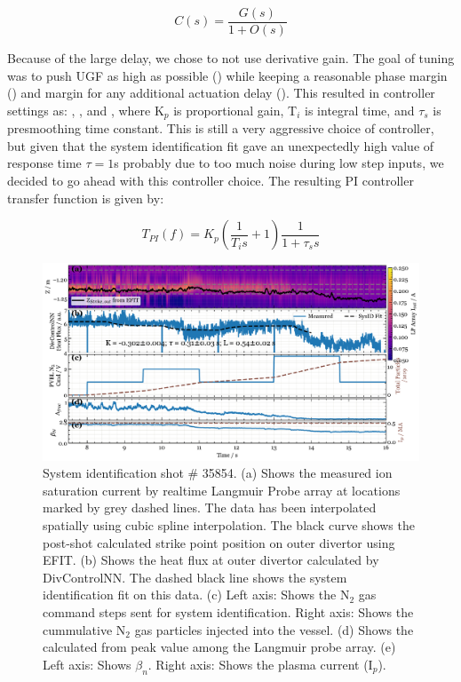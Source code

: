 \begin{equation}
    C(s) = \frac{G(s)}{1 + O(s)}
\end{equation}

Because of the large delay, we chose to not use derivative gain. The goal of tuning was to push \ac{UGF} as high as possible (\AfracUGF) while keeping a reasonable phase margin (\AfracPhaseMargin) and margin for any additional actuation delay (\AfracDelayMargin). This resulted in controller settings as: \AfracKp, \AfracTi, and \Afracstau, where K$_p$ is proportional gain, T$_i$ is integral time, and $\tau_s$ is presmoothing time constant. This is still a very aggressive choice of controller, but given that the system identification fit gave an unexpectedly high value of response time $\tau=1$s probably due to too much noise during low step inputs, we decided to go ahead with this controller choice. The resulting PI controller transfer function is given by:

\begin{equation}
    T_{PI}(f) = K_p \left( \frac{1}{T_i s} + 1\right) \frac{1}{1 + \tau_s s}
\label{eq:PI}
\end{equation}

\begin{figure}[!ht]
 \centering
 \includegraphics[width=\textwidth]{figures/DetCtrl_2D_35854.pdf}
 \caption{System identification shot \# 35854. (a) Shows the measured ion saturation current by realtime Langmuir Probe array at locations marked by grey dashed lines. The data has been interpolated spatially using cubic spline interpolation. The black curve shows the post-shot calculated strike point position on outer divertor using EFIT. (b) Shows the heat flux at outer divertor calculated by DivControlNN. The dashed black line shows the system identification fit on this data. (c) Left axis: Shows the N$_2$ gas command steps sent for system identification. Right axis: Shows the cummulative N$_2$ gas particles injected into the vessel. 
 (d) Shows the \Afrac calculated from peak value among the Langmuir probe array. (e) Left axis: Shows $\beta_n$. Right axis: Shows the plasma current (I$_p$).}
 \label{fig:sysid_sm}
\end{figure}

